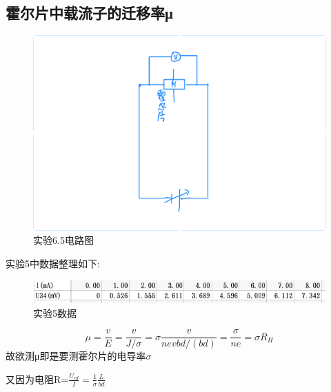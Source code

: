 \documentclass{thuemp}
\begin{document}
\subsection{霍尔片中载流子的迁移率μ}
\begin{figure}[H]
	\centering
	\includegraphics[width=0.8\linewidth]{./image/10.png}
	\caption{实验6.5电路图} \label{fig:eg}
\end{figure}
实验5中数据整理如下:
\begin{figure}[H]
	\centering
	\includegraphics[width=0.8\linewidth]{./image/n6.png}
	\caption{实验5数据} \label{fig:eg}
\end{figure}

\[\mu=\frac{v}{E}=\frac{v}{J/\sigma}=\sigma\frac{v}{nevbd/(bd)}=\frac{\sigma}{ne}=\sigma R_{H}\]
故欲测μ即是要测霍尔片的电导率$\sigma$

又因为电阻R=$ \frac{U_{cd}}{I}=\frac{1}{\sigma}\frac{L}{bd} $
\end{document}
